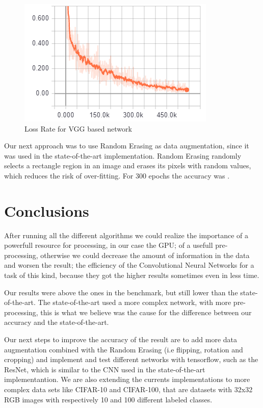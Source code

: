 \documentclass[twoside,twocolumn]{article}
\begin{document}
    
    \begin{figure}[h]
    \begin{center}
		\includegraphics[scale=0.6]{lossRateVGG.png}
        \caption{Loss Rate for VGG based network\label{fig:lossRateVGG}}    
    \end{center}
    \end{figure}
    
    Our next approach was to use Random Erasing as data augmentation, since it was used in the state-of-the-art implementation. Random Erasing randomly
selects a rectangle region in an image and erases its pixels with random values, which reduces the risk of over-fitting. For 300 epochs the accuracy was .


	\section{Conclusions}
	
	After running all the different algorithms we could realize the importance of a powerfull resource for processing, in our case the GPU; of a usefull pre-processing, otherwise we could decrease the amount of information in the data and worsen the result; the efficiency of the Convolutional Neural Networks for a task of this kind, because they got the higher results sometimes even in less time.
	
	Our results were above the ones in the benchmark, but still lower than the state-of-the-art. The state-of-the-art used a more complex network, with more pre-processing, this is what we believe was the cause for the difference between our accuracy and the state-of-the-art.
	
	Our next steps to improve the accuracy of the result are to add more data augmentation combined with the Random Erasing (i.e flipping, rotation and cropping) and implement and test different networks with tensorflow, such as the ResNet, which is similar to the CNN used in the state-of-the-art implementantion. We are also extending the currents implementations to more complex data sets like CIFAR-10 and CIFAR-100, that are datasets with 32x32 RGB images with respectively 10 and 100 different labeled classes.
    





\end{document}
